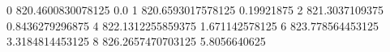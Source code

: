 0 820.4600830078125 0.0
1 820.6593017578125 0.19921875
2 821.3037109375 0.8436279296875
4 822.1312255859375 1.671142578125
6 823.778564453125 3.3184814453125
8 826.2657470703125 5.8056640625
